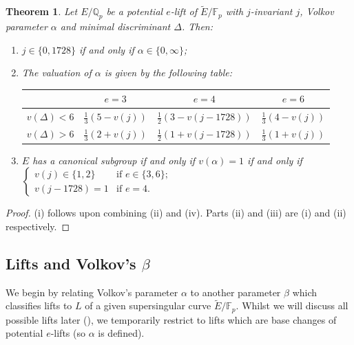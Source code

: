 \documentclass{amsart}
\newcommand{\Qp}{\mathbb{Q}_p}
\newtheorem{theorem}{Theorem}
\theoremstyle{definition}
\newcommand{\F}{\mathbb{F}}
\numberwithin{theorem}{section}
\numberwithin{equation}{section}
\begin{document}
\begin{theorem}
\label{thm: valuation alpha overview}
Let $E/\Qp$ be a potential $e$-lift of $\tilde{E}/\mathbb{F}_p$ with $j$-invariant $j$, Volkov parameter $\alpha$ and minimal discriminant $\Delta$. Then:
\begin{enumerate}
    \item $j \in \{0,1728\}$ if and only if $\alpha \in \{0,\infty\}$;
    \item The valuation of $\alpha$ is given by the following table:

\begin{center}
 \begin{tabular}{c|ccc}
     & $e=3$ & $e=4$ & $e=6$ \\ \hline 
     $v(\Delta) < 6$  & $\frac{1}{3}(5-v(j))$ & $\frac{1}{2}(3-v(j-1728))$ & $\frac{1}{3}(4-v(j))$ \\[0.1in]
     $v(\Delta) > 6$ & $\frac{1}{3}(2+v(j))$ & $\frac{1}{2}(1+v(j-1728))$ & $\frac{1}{3}(1+v(j))$
 \end{tabular}
\end{center}

    
    \item $E$ has a canonical subgroup if and only if $v(\alpha)=1$ if and only if
    $\begin{cases}
        v(j) \in \{1,2\} &\text{if } e \in \{3,6\}; \\
        v(j-1728)=1 &\text{if } e=4. 
    \end{cases}$
\end{enumerate}
\end{theorem}

\begin{proof}
(i) follows upon combining (ii) and (iv). Parts (ii) and (iii) are (i) and (ii) respectively.
\end{proof}


\subsection{Lifts and Volkov's $\beta$}

We begin by relating Volkov's parameter $\alpha$ to another parameter $\beta$ which classifies lifts to $L$ of a given supersingular curve $\tilde{E}/\F_p$. Whilst we will discuss all possible lifts later (), we temporarily restrict to lifts which are base changes of potential $e$-lifts (so $\alpha$ is defined). 
\end{document}
